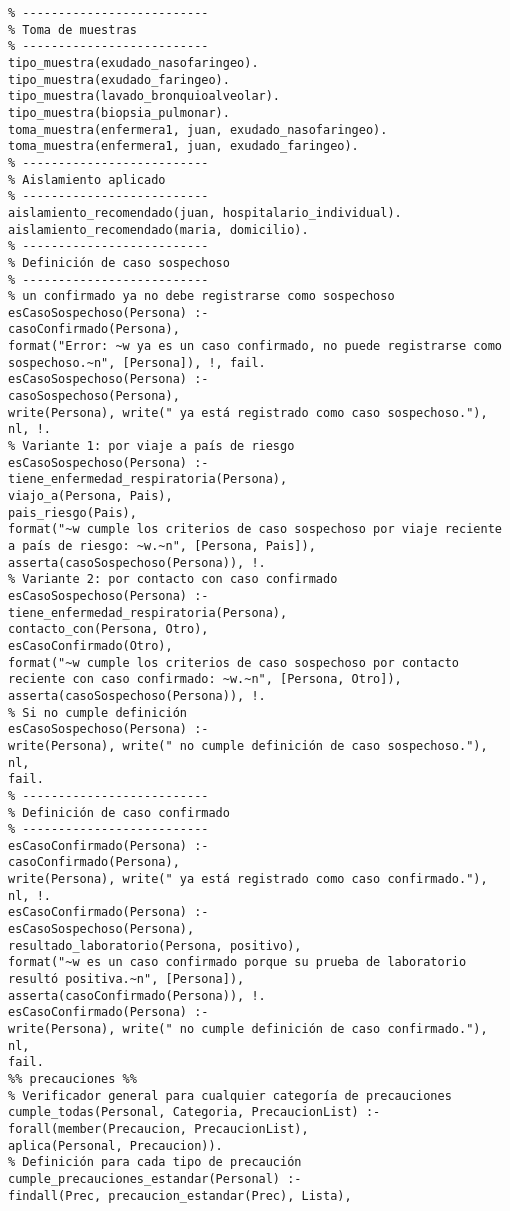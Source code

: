 \documentclass[11pt, letterpaper]{article}
\begin{document}
\begin{verbatim}
% --------------------------
% Toma de muestras
% --------------------------
tipo_muestra(exudado_nasofaringeo).
tipo_muestra(exudado_faringeo).
tipo_muestra(lavado_bronquioalveolar).
tipo_muestra(biopsia_pulmonar).
toma_muestra(enfermera1, juan, exudado_nasofaringeo).
toma_muestra(enfermera1, juan, exudado_faringeo).
% --------------------------
% Aislamiento aplicado
% --------------------------
aislamiento_recomendado(juan, hospitalario_individual).
aislamiento_recomendado(maria, domicilio).
% --------------------------
% Definición de caso sospechoso
% --------------------------
% un confirmado ya no debe registrarse como sospechoso
esCasoSospechoso(Persona) :-
casoConfirmado(Persona),
format("Error: ~w ya es un caso confirmado, no puede registrarse como sospechoso.~n", [Persona]), !, fail.
esCasoSospechoso(Persona) :-
casoSospechoso(Persona), 
write(Persona), write(" ya está registrado como caso sospechoso."), nl, !.
% Variante 1: por viaje a país de riesgo
esCasoSospechoso(Persona) :-
tiene_enfermedad_respiratoria(Persona),
viajo_a(Persona, Pais),
pais_riesgo(Pais),
format("~w cumple los criterios de caso sospechoso por viaje reciente a país de riesgo: ~w.~n", [Persona, Pais]),
asserta(casoSospechoso(Persona)), !.
% Variante 2: por contacto con caso confirmado
esCasoSospechoso(Persona) :-
tiene_enfermedad_respiratoria(Persona),
contacto_con(Persona, Otro),
esCasoConfirmado(Otro),
format("~w cumple los criterios de caso sospechoso por contacto reciente con caso confirmado: ~w.~n", [Persona, Otro]),
asserta(casoSospechoso(Persona)), !.
% Si no cumple definición
esCasoSospechoso(Persona) :-
write(Persona), write(" no cumple definición de caso sospechoso."), nl,
fail.
% --------------------------
% Definición de caso confirmado
% --------------------------
esCasoConfirmado(Persona) :-
casoConfirmado(Persona), 
write(Persona), write(" ya está registrado como caso confirmado."), nl, !.
esCasoConfirmado(Persona) :-
esCasoSospechoso(Persona),
resultado_laboratorio(Persona, positivo),
format("~w es un caso confirmado porque su prueba de laboratorio resultó positiva.~n", [Persona]),
asserta(casoConfirmado(Persona)), !.
esCasoConfirmado(Persona) :-
write(Persona), write(" no cumple definición de caso confirmado."), nl,
fail.
%% precauciones %%
% Verificador general para cualquier categoría de precauciones
cumple_todas(Personal, Categoria, PrecaucionList) :-
forall(member(Precaucion, PrecaucionList),
aplica(Personal, Precaucion)).
% Definición para cada tipo de precaución
cumple_precauciones_estandar(Personal) :-
findall(Prec, precaucion_estandar(Prec), Lista),

\end{verbatim}
\end{document}
